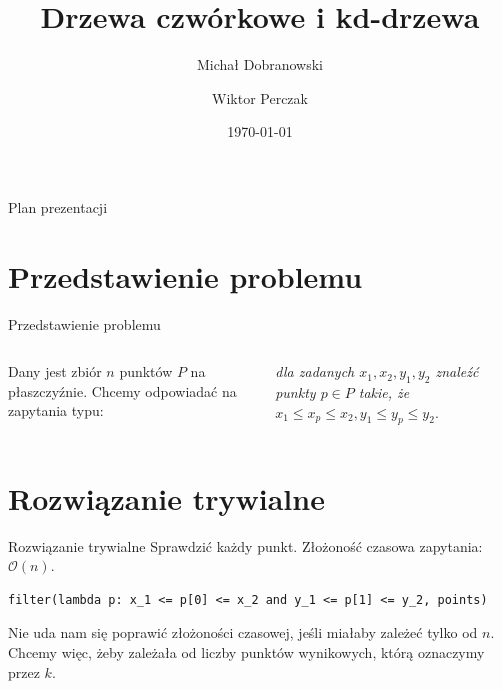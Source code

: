 \documentclass[aspectratio=169,dvipsnames]{beamer}
\title{Drzewa czwórkowe i kd-drzewa}
\date{\today}
\author{Michał Dobranowski \and Wiktor Perczak}
\newcommand{\sO}{\mathcal O}
\begin{document}
\maketitle

\begin{frame}{Plan prezentacji}
    \tableofcontents
\end{frame}

\section{Przedstawienie problemu}

\begin{frame}{Przedstawienie problemu}
    \begin{columns}

    Dany jest zbiór $n$ punktów $P$ na płaszczyźnie. Chcemy odpowiadać na zapytania typu:
    \begin{center}
        \textit{dla zadanych $x_1, x_2, y_1, y_2$ znaleźć punkty $p \in P$ takie, że $x_1 \leq x_p \leq x_2, y_1 \leq y_p \leq y_2$}.
    \end{center}

    \centering

    \end{columns}
\end{frame}

\section{Rozwiązanie trywialne}

\begin{frame}[fragile]{Rozwiązanie trywialne}
    Sprawdzić każdy punkt. Złożoność czasowa zapytania: $\sO(n)$.

    \pause
    \hspace*{\fill}
    \begin{verbatim}
filter(lambda p: x_1 <= p[0] <= x_2 and y_1 <= p[1] <= y_2, points)
    \end{verbatim}
    \hspace*{\fill}

    \pause Nie uda nam się poprawić złożoności czasowej, jeśli miałaby zależeć tylko od $n$. Chcemy więc, żeby zależała od liczby punktów wynikowych, którą oznaczymy przez $k$.
\end{frame}
\end{document}
